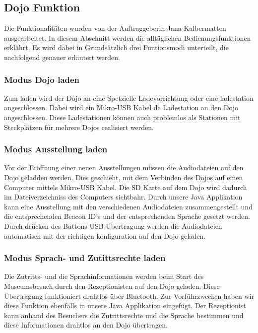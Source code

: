 \subsection{Dojo Funktion}
Die Funktionalitäten wurden von der Auftraggeberin Jana Kalbermatten ausgearbeitet. In diesem Abschnitt werden die alltäglichen Bedienungsfunktionen erklährt. Es wird dabei in Grundsätzlich drei Funtionsmodi unterteilt, die nachfolgend genauer erläutert werden.
\subsubsection{Modus Dojo laden}
Zum laden wird der Dojo an eine Spetzielle Ladevorrichtung oder eine ladestation angeschlossen. Dabei wird ein Mikro-USB Kabel de Ladestation an den Dojo angeschlossen. Diese Ladestationen können auch problemlos als Stationen mit Steckplätzen für mehrere Dojos realisiert werden.
\subsubsection{Modus Ausstellung laden}
Vor der Eröffnung einer neuen Ausstellungen müssen die Audiodateien auf den Dojo geladden werden. Dies geschieht, mit dem Verbinden des Dojos auf einen Computer mittels Mikro-USB Kabel. Die SD Karte auf dem Dojo wird dadurch im Dateiverzeichniss des Computers sichtbahr. Durch unsere Java Applikation kann eine Ausstellung mit den verschiedenen Audiodateien zusammengestellt und die entsprechenden Beacon ID's und der entsprechenden Sprache gesetzt werden. Durch drücken des Buttons USB-Übertragung werden die Audiodateien automatisch mit der richtigen konfiguration auf den Dojo geladen.

\subsubsection{Modus Sprach- und Zutittsrechte laden}
Die Zutritts- und die Sprachinformationen werden beim Start des Museumsbesuch durch den Rezeptionisten auf den Dojo geladen. Diese Übertragung funktioniert drahtlos über Bluetooth. Zur Vorführzwecken haben wir diese Funktion ebenfalls in unsere Java Applikation eingefügt. Der Rezeptionist kann anhand des Besuchers die Zutrittsrechte und die Sprache bestimmen und diese Informationen drahtlos an den Dojo übertragen.

